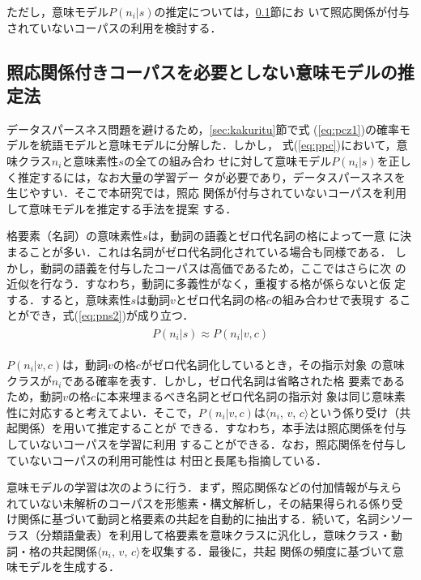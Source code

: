 \noindent
ただし，意味モデル$P(n_i|s)$の推定については，\ref{sec:imimodel}節にお
いて照応関係が付与されていないコーパスの利用を検討する．


\subsection{照応関係付きコーパスを必要としない意味モデルの推定法}
\label{sec:imimodel}

データスパースネス問題を避けるため，\ref{sec:kakuritu}節で式
(\ref{eq:pcz1})の確率モデルを統語モデルと意味モデルに分解した．しかし，
式(\ref{eq:ppc})において，意味クラス$n_i$と意味素性$s$の全ての組み合わ
せに対して意味モデル$P(n_i|s)$を正しく推定するには，なお大量の学習デー
タが必要であり，データスパースネスを生じやすい．そこで本研究では，照応
関係が付与されていないコーパスを利用して意味モデルを推定する手法を提案
する．

格要素（名詞）の意味素性$s$は，動詞の語義とゼロ代名詞の格によって一意
に決まることが多い．これは名詞がゼロ代名詞化されている場合も同様である．
しかし，動詞の語義を付与したコーパスは高価であるため，ここではさらに次
の近似を行なう．すなわち，動詞に多義性がなく，重複する格が係らないと仮
定する．すると，意味素性$s$は動詞$v$とゼロ代名詞の格$c$の組み合わせで表現す
ることができ，式(\ref{eq:pns2})が成り立つ．
\begin{eqnarray}
  \label{eq:pns2}
  \begin{array}{rcl}
    P(n_i|s)\approx P(n_i|v,c)
  \end{array}
\end{eqnarray}

\noindent
$P(n_i|v,c)$は，動詞$v$の格$c$がゼロ代名詞化しているとき，その指示対象
の意味クラスが$n_i$である確率を表す．しかし，ゼロ代名詞は省略された格
要素であるため，動詞$v$の格$c$に本来埋まるべき名詞とゼロ代名詞の指示対
象は同じ意味素性に対応すると考えてよい．そこで，$P(n_i|v,c)$は$\langle
n_i$, $v$, $c\rangle$という係り受け（共起関係）を用いて推定することが
できる．すなわち，本手法は照応関係を付与していないコーパスを学習に利用
することができる．なお，照応関係を付与していないコーパスの利用可能性は
村田と長尾\citeyear{murata98}も指摘している．

意味モデルの学習は次のように行う．まず，照応関係などの付加情報が与えら
れていない未解析のコーパスを形態素・構文解析し，その結果得られる係り受
け関係に基づいて動詞と格要素の共起を自動的に抽出する．続いて，名詞シソー
ラス（分類語彙表）を利用して格要素を意味クラスに汎化し，意味クラス・動
詞・格の共起関係$\langle n_i$, $v$, $c\rangle$を収集する．最後に，共起
関係の頻度に基づいて意味モデルを生成する．

